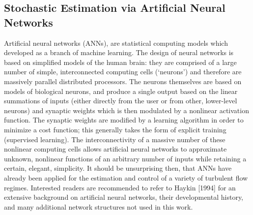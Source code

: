 \subsection{Stochastic Estimation via Artificial Neural Networks}
Artificial neural networks (ANNs), are statistical computing models which developed as a branch of machine learning.
The design of neural networks is based on simplified models of the human brain: they are comprised of a large number of simple, interconnected computing cells (`neurons') and therefore are massively parallel distributed processors.
The neurons themselves are based on models of biological neurons, and produce a single output based on the linear summations of inputs (either directly from the user or from other, lower-level neurons) and synaptic weights which is then modulated by a nonlinear activation function.
The synaptic weights are modified by a learning algorithm in order to minimize a cost function; this generally takes the form of explicit training (supervised learning).
The interconnectivity of a massive number of these nonlinear computing cells allows artificial neural networks to approximate unknown, nonlinear functions of an arbitrary number of inputs while retaining a certain, elegant, simplicity.
It should be unsurprising then, that ANNs have already been applied for the estimation and control of a variety of turbulent flow regimes.
Interested readers are recommended to refer to Haykin [1994] for an extensive background on artificial neural networks, their developmental history, and many additional network structures not used in this work.

